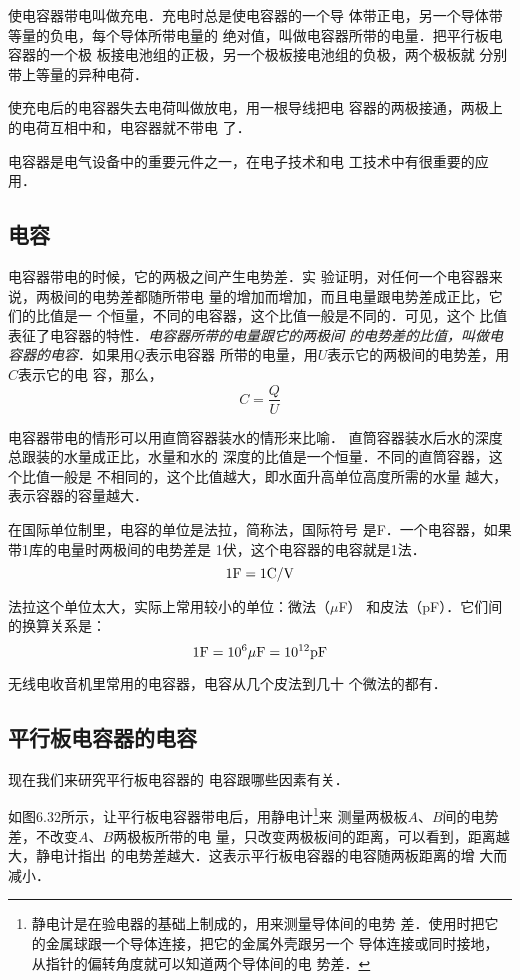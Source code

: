 使电容器带电叫做充电．充电时总是使电容器的一个导
体带正电，另一个导体带等量的负电，每个导体所带电量的
绝对值，叫做电容器所带的电量．把平行板电容器的一个极
板接电池组的正极，另一个极板接电池组的负极，两个极板就
分别带上等量的异种电荷．

使充电后的电容器失去电荷叫做放电，用一根导线把电
容器的两极接通，两极上的电荷互相中和，电容器就不带电
了．

电容器是电气设备中的重要元件之一，在电子技术和电
工技术中有很重要的应用．

\subsection{电容}
电容器带电的时候，它的两极之间产生电势差．实
验证明，对任何一个电容器来说，两极间的电势差都随所带电
量的增加而增加，而且电量跟电势差成正比，它们的比值是一
个恒量，不同的电容器，这个比值一般是不同的．可见，这个
比值表征了电容器的特性．\textit{电容器所带的电量跟它的两极间
的电势差的比值，叫做电容器的电容}．如果用$Q$表示电容器
所带的电量，用$U$表示它的两极间的电势差，用$C$表示它的电
容，那么，
\[C=\frac{Q}{U} \]

电容器带电的情形可以用直筒容器装水的情形来比喻．
直筒容器装水后水的深度总跟装的水量成正比，水量和水的
深度的比值是一个恒量．不同的直筒容器，这个比值一般是
不相同的，这个比值越大，即水面升高单位高度所需的水量
越大，表示容器的容量越大．

在国际单位制里，电容的单位是法拉，简称法，国际符号
是F．一个电容器，如果带1库的电量时两极间的电势差是
1伏，这个电容器的电容就是1法．
\[1{\rm F}=1{\rm C}/{\rm V}\]

法拉这个单位太大，实际上常用较小的单位：微法（$\mu$F）
和皮法（pF）．它们间的换算关系是：
\[1{\rm F}=10^6\mu{\rm F}=10^{12}{\rm pF}\]

无线电收音机里常用的电容器，电容从几个皮法到几十
个微法的都有．

\subsection{平行板电容器的电容}


现在我们来研究平行板电容器的
电容跟哪些因素有关．

如图6.32所示，让平行板电容器带电后，用静电计\footnote{静电计是在验电器的基础上制成的，用来测量导体间的电势
差．使用时把它的金属球跟一个导体连接，把它的金属外壳跟另一个
导体连接或同时接地，从指针的偏转角度就可以知道两个导体间的电
势差．}来
测量两极板$A$、$B$间的电势差，不改变$A$、$B$两极板所带的电
量，只改变两极板间的距离，可以看到，距离越大，静电计指出
的电势差越大．这表示平行板电容器的电容随两板距离的增
大而减小．

